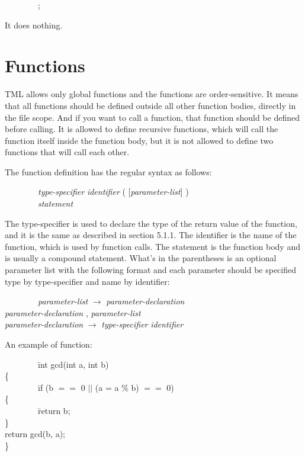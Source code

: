\documentclass[12pt,psfig,a4]{article}
\begin{document}
\begin{code}
\begin{tabbing}
~~~~~~~~;
\end{tabbing}
\end{code}

It does nothing.


\section{Functions}
TML allows only global functions and the functions are order-sensitive. It means that all functions should be defined outside all other function bodies, directly in the file scope. And if you want to call a function, that function should be defined before calling. It is allowed to define recursive functions, which will call the function itself inside the function body, but it is not allowed to define two functions that will call each other.

The function definition has the regular syntax as follows:
\begin{code}
\begin{tabbing}
~~~~~~~~\= \textsl{type-specifier} \textsl{identifier} ( [\textsl{parameter-list}] ) \\
\> ~~~~~~~~\textsl{statement}
\end{tabbing}
\end{code}

The type-specifier is used to declare the type of the return value of the function, and it is the same as described in section 5.1.1. The identifier is the name of the function, which is used by function calls. The statement is the function body and is usually a compound statement. What's in the parentheses is an optional parameter list with the following format and each parameter should be specified type by type-specifier and name by identifier:
\begin{code}
\begin{tabbing}
~~~~~~~~\= \textsl{parameter-list} $\rightarrow$ \= \textsl{parameter-declaration} \\
\> \> \textsl{parameter-declaration} , \textsl{parameter-list} \\
\> \textsl{parameter-declaration} $\rightarrow$ \textsl{type-specifier} \textsl{identifier}
\end{tabbing}
\end{code}

An example of function:
\begin{code}
\begin{tabbing}
~~~~~~~~\= int gcd(int a, int b) \\
\> \{ \\
\> ~~~~~~~~\= if (b $==$ 0 $||$ (a = a \% b) $==$ 0) \\
\> \> \{ \\
\> \> ~~~~~~~~\= return b; \\
\> \> \} \\
\> \> return gcd(b, a); \\
\> \}
\end{tabbing}
\end{code}
\end{document}
